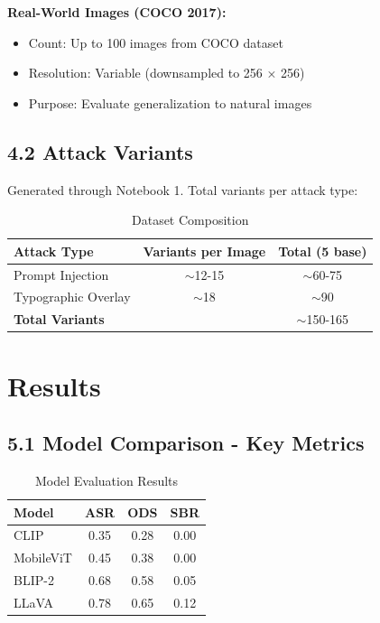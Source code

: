 \documentclass[12pt, a4paper]{article}
\begin{document}
\textbf{Real-World Images (COCO 2017):}
\begin{itemize}
    \item Count: Up to 100 images from COCO dataset
    \item Resolution: Variable (downsampled to 256 × 256)
    \item Purpose: Evaluate generalization to natural images
\end{itemize}

\subsection{4.2 Attack Variants}

Generated through Notebook 1. Total variants per attack type:

\begin{table}[H]
\centering
\begin{tabular}{|l|c|c|}
\hline
\textbf{Attack Type} & \textbf{Variants per Image} & \textbf{Total (5 base)} \\
\hline
Prompt Injection & $\sim$12-15 & $\sim$60-75 \\
Typographic Overlay & $\sim$18 & $\sim$90 \\
\hline
\textbf{Total Variants} & & $\sim$150-165 \\
\hline
\end{tabular}
\caption{Dataset Composition}
\end{table}

\section{Results}

\subsection{5.1 Model Comparison - Key Metrics}

\begin{table}[H]
\centering
\begin{tabular}{|l|c|c|c|}
\hline
\textbf{Model} & \textbf{ASR} & \textbf{ODS} & \textbf{SBR} \\
\hline
CLIP & 0.35 & 0.28 & 0.00 \\
MobileViT & 0.45 & 0.38 & 0.00 \\
BLIP-2 & 0.68 & 0.58 & 0.05 \\
LLaVA & 0.78 & 0.65 & 0.12 \\
\hline
\end{tabular}
\caption{Model Evaluation Results}
\label{tab:results}
\end{table}
\end{document}

